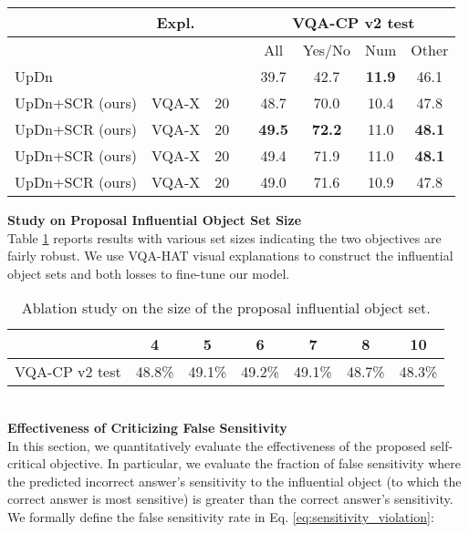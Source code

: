 \documentclass{article}
\begin{document}
\begin{table*}[!t]
\centering
\begin{tabular}{l|c|cr|cccc}
\hline \toprule
                    & Expl. &  &  & \multicolumn{4}{c}{VQA-CP v2 test}\\    \hline
                    &       &  &  & All     & Yes/No &  Num  & Other \\ \hline\hline
UpDn    \cite{anderson2017bottom}            &       &  &  & 39.7   &  42.7  & \textbf{11.9}  & 46.1  \\ \hline
UpDn+SCR (ours)   &  VQA-X  & 20 &  & 48.7   &  70.0  & 10.4  & 47.8  \\
UpDn+SCR (ours)   &  VQA-X  & 20 &  & \textbf{49.5}   &  \textbf{72.2}  & 11.0  & \textbf{48.1}  \\
UpDn+SCR (ours)   &  VQA-X  & 20 &  & 49.4   &  71.9  & 11.0  & \textbf{48.1}  \\ 
UpDn+SCR (ours)   &  VQA-X  & 20 &  & 49.0   &  71.6  & 10.9  & 47.8  \\ \bottomrule
\end{tabular}
\caption{Ablation study on various self-critical loss weights on VQA-CP test data.  The ``Expl.'' column shows the source of explanations for training the VQA systems. The ``'' column shows the self-critical loss weight. SCR is the short hand for our self-critical reasoning approach.}
\label{tab:crit_ablation}
\end{table*}

\noindent\textbf{Study on Proposal Influential Object Set Size}\\
Table \ref{tab:ablation_study} reports results with various set sizes indicating the two objectives are fairly robust. We use VQA-HAT visual explanations to construct the influential object sets and both losses to fine-tune our model. 
\begin{table}[h]
\centering
\begin{tabular}{c|c|c|c|c|c|c}
\hline \toprule
 & 4   & 5   &  6    & 7  & 8  & 10  \\  \hline
VQA-CP v2 test  & 48.8\% & 49.1\% & 49.2\% & 49.1\% & 48.7\% & 48.3\%  \\ \bottomrule
\end{tabular}
\caption{Ablation study on the size of the proposal influential object set.}
\label{tab:ablation_study}
\end{table}\\
\noindent\textbf{Effectiveness of Criticizing False Sensitivity}\\
\label{sec:fsr}
In this section, we quantitatively evaluate the effectiveness of the proposed self-critical objective. In particular, we evaluate the fraction of false sensitivity where the predicted incorrect answer's sensitivity to the influential object (to which the correct answer is most sensitive) is greater than the correct answer's sensitivity. We formally define the false sensitivity rate in Eq. \ref{eq:sensitivity_violation}:
\end{document}
